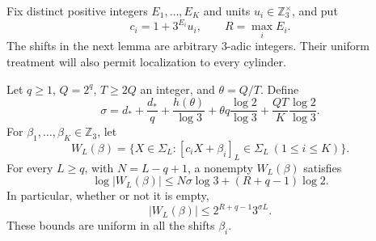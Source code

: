 Fix distinct positive integers $E_1,\ldots,E_K$ and units
$u_i\in\mathbb Z_3^\times$, and put
\[
 c_i=1+3^{E_i}u_i,\qquad R=\max_i E_i.
\]
The shifts in the next lemma are arbitrary $3$-adic integers.  Their
uniform treatment will also permit localization to every cylinder.

\begin{lemma}\label{gen:affine-count}
Let $q\ge1$, $Q=2^q$, $T\ge2Q$ an integer, and $\theta=Q/T$.
Define
\begin{equation}\label{gen:sigma}
 \sigma=d_*+\frac{d_*}{q}
       +\frac{h(\theta)}{\log3}
       +\theta q\frac{\log2}{\log3}
       +\frac{QT}{K}\frac{\log2}{\log3}.
\end{equation}
For $\beta_1,\ldots,\beta_K\in\mathbb Z_3$, let
\[
 W_L(\beta)=\{X\in\Sigma_L:
                   [c_iX+\beta_i]_L\in\Sigma_L\ (1\le i\le K)\}.
\]
For every $L\ge q$, with $N=L-q+1$, a nonempty $W_L(\beta)$ satisfies
\begin{equation}\label{gen:finite-log}
 \log |W_L(\beta)|
       \le N\sigma\log3+(R+q-1)\log2.
\end{equation}
In particular, whether or not it is empty,
\begin{equation}\label{gen:finite-count}
 |W_L(\beta)|\le2^{R+q-1}3^{\sigma L}.
\end{equation}
These bounds are uniform in all the shifts $\beta_i$.
\end{lemma}
